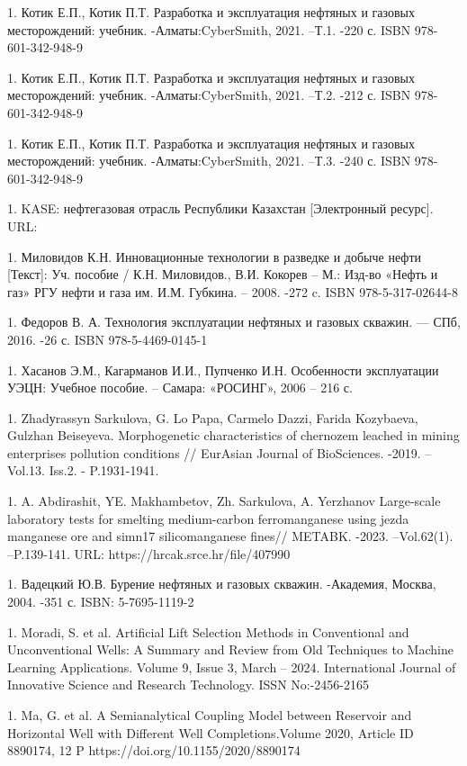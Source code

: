 \begin{references}
1. Котик Е.П., Котик П.Т. Разработка и эксплуатация нефтяных и газовых
месторождений: учебник. -Алматы:CyberSmith, 2021. --Т.1. -220 с. ISBN
978-601-342-948-9

1. Котик Е.П., Котик П.Т. Разработка и эксплуатация нефтяных и газовых
месторождений: учебник. -Алматы:CyberSmith, 2021. --Т.2. -212 с. ISBN
978-601-342-948-9

1. Котик Е.П., Котик П.Т. Разработка и эксплуатация нефтяных и газовых
месторождений: учебник. -Алматы:CyberSmith, 2021. --Т.3. -240 с. ISBN
978-601-342-948-9

1. KASE: нефтегазовая отрасль Республики Казахстан {[}Электронный
ресурс{]}. URL:
\href{https://kase.kz/files/presentations/ru/KASE_OilGas_industry_2019.pdf}{}

1. Миловидов К.Н. Инновационные технологии в разведке и добыче нефти
{[}Текст{]}: Уч. пособие / К.Н. Миловидов., В.И. Кокорев -- М.: Изд-во
«Нефть и газ» РГУ нефти и газа им. И.М. Губкина. -- 2008. -272 c. ISBN
978-5-317-02644-8

1. Федоров В. А. Технология эксплуатации нефтяных и газовых скважин. ---
СПб, 2016. -26 с. ISBN 978-5-4469-0145-1

1. Хасанов Э.М., Кагарманов И.И., Пупченко И.Н. Особенности эксплуатации
УЭЦН: Учебное пособие. -- Самара: «РОСИНГ», 2006 -- 216 с.

1. Zhadуrassyn Sarkulova, G. Lo Papa, Carmelo Dazzi, Farida Kozybaeva,
Gulzhan Beiseyeva. Morphogenetic characteristics of chernozem leached
in mining enterprises pollution conditions // EurAsian Journal of
BioSciences. -2019. --Vol.13. Iss.2. - P.1931-1941.

1. A. Abdirashit, YE. Makhambetov, Zh. Sarkulova, A. Yerzhanov
Large-scale laboratory tests for smelting medium-carbon ferromanganese
using jezda manganese ore and simn17 silicomanganese fines// METABK.
-2023. --Vol.62(1). --P.139-141. URL:
https://hrcak.srce.hr/file/407990

1. Вадецкий Ю.В. Бурение нефтяных и газовых скважин. -Академия, Москва,
2004. -351 с. ISBN: 5-7695-1119-2

1. Moradi, S. et al. Artificial Lift Selection Methods in Conventional
and Unconventional Wells: A Summary and Review from Old Techniques to
Machine Learning Applications. Volume 9, Issue 3, March -- 2024.
International Journal of Innovative Science and Research Technology.
ISSN No:-2456-2165

1. Ma, G. et al. A Semianalytical Coupling Model between Reservoir and
Horizontal Well with Different Well Completions.Volume 2020, Article
ID 8890174, 12 P https://doi.org/10.1155/2020/8890174
\end{references}

